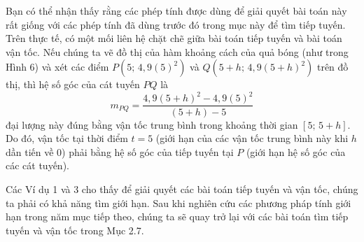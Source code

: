 \begin{minipage}[t]{0.70\textwidth}
  \vspace{4pt}
  Bạn có thể nhận thấy rằng các phép tính được dùng để giải quyết bài toán này rất giống với các phép tính đã dùng trước đó trong mục này để tìm tiếp tuyến. Trên thực tế, có một mối liên hệ chặt chẽ giữa bài toán tiếp tuyến và bài toán vận tốc. Nếu chúng ta vẽ đồ thị của hàm khoảng cách của quả bóng (như trong Hình 6) và xét các điểm $P(5;\, 4{,}9(5)^2)$ và $Q(5 + h;\, 4{,}9(5 + h)^2)$ trên đồ thị, thì hệ số góc của cát tuyến $PQ$ là
  \[
    m_{PQ} = \frac{4{,}9(5 + h)^2 - 4{,}9(5)^2}{(5 + h) - 5}
  \]
  đại lượng này đúng bằng vận tốc trung bình trong khoảng thời gian $[5;\, 5 + h]$. Do đó, vận tốc tại thời điểm $t = 5$ (giới hạn của các vận tốc trung bình này khi $h$ dần tiến về $0$) phải bằng hệ số góc của tiếp tuyến tại $P$ (giới hạn hệ số góc của các cát tuyến).

  \vspace{2pt}
  Các Ví dụ 1 và 3 cho thấy để giải quyết các bài toán tiếp tuyến và vận tốc, chúng ta phải có khả năng tìm giới hạn. Sau khi nghiên cứu các phương pháp tính giới hạn trong năm mục tiếp theo, chúng ta sẽ quay trở lại với các bài toán tìm tiếp tuyến và vận tốc trong Mục 2.7.
\end{minipage}
